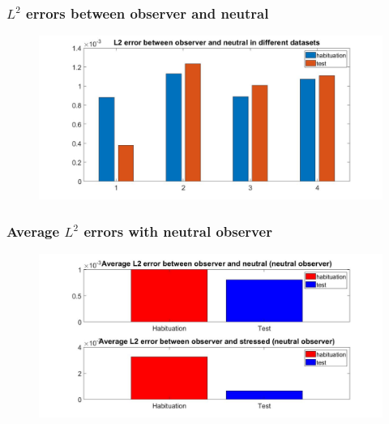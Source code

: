 \documentclass{beamer}
\begin{document}
\begin{frame}
\frametitle{ $L^2$ errors between observer and neutral}



\begin{figure}[H]
\begin{center}
	\hspace*{-1.7cm}
	\includegraphics[scale=.32]{L2_err_neut.jpg} 
\end{center}  


\end{figure}

\end{frame}


\begin{frame}
\frametitle{Average $L^2$ errors with neutral observer}


\begin{figure}[H]
	\begin{center}
		\hspace*{-1.7cm}
		\includegraphics[scale=.32]{avg_L2.jpg} 
	\end{center}  
	
	
\end{figure}



\end{frame}
\end{document}
